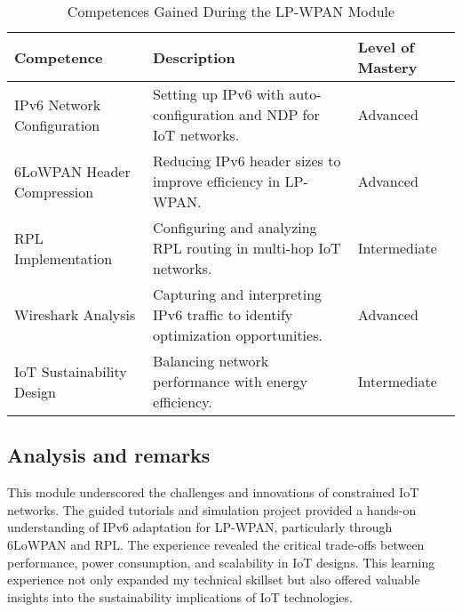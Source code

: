 \begin{table}[h!]
    \centering
    \begin{tabular}{|p{3.5cm}|p{8cm}|p{3.5cm}|}
    \hline
    \textbf{Competence} & \textbf{Description} & \textbf{Level of Mastery} \\
    \hline
    IPv6 Network Configuration & Setting up IPv6 with auto-configuration and NDP for IoT networks. & Advanced \\
    \hline
    6LoWPAN Header Compression & Reducing IPv6 header sizes to improve efficiency in LP-WPAN. & Advanced \\
    \hline
    RPL Implementation & Configuring and analyzing RPL routing in multi-hop IoT networks. & Intermediate \\
    \hline
    Wireshark Analysis & Capturing and interpreting IPv6 traffic to identify optimization opportunities. & Advanced \\
    \hline
    IoT Sustainability Design & Balancing network performance with energy efficiency. & Intermediate \\
    \hline
    \end{tabular}
    \caption{Competences Gained During the LP-WPAN Module}
\end{table}

\subsection{Analysis and remarks}
\indent This module underscored the challenges and innovations of constrained IoT networks.
The guided tutorials and simulation project provided a hands-on understanding of IPv6 adaptation for LP-WPAN, particularly through 6LoWPAN and RPL.
The experience revealed the critical trade-offs between performance, power consumption, and scalability in IoT designs.
This learning experience not only expanded my technical skillset but also offered valuable insights into the sustainability implications of IoT technologies.